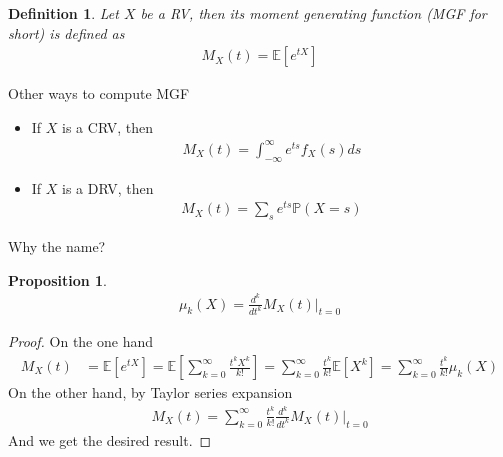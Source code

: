 \documentclass[10pt]{article}
\newtheorem*{proposition}{Proposition}
\newtheorem*{definition}{Definition}
\begin{document}
\begin{definition}
    Let $X$ be a RV, then its moment generating function (MGF for short) is
    defined as
    \begin{align}
        M_X(t)=\mathbb{E}[e^{tX}]
    \end{align}
\end{definition}

Other ways to compute MGF

\begin{itemize}
    \item If $X$ is a CRV, then
          \begin{align}
              M_X(t)=\int_{-\infty}^\infty e^{ts}f_X(s)ds
          \end{align}
    \item If $X$ is a DRV, then
          \begin{align}
              M_X(t)=\sum_s e^{ts}\mathbb{P}(X=s)
          \end{align}
\end{itemize}

Why the name?

\begin{proposition}
    \begin{align}
        \mu_k(X)=\frac{d^k}{dt^k}M_X(t)\Biggl|_{t=0}
    \end{align}
\end{proposition}

\begin{proof}
    On the one hand
    \begin{align}
        M_X(t)
         & =\mathbb{E}[e^{tX}]
        =\mathbb{E}[\sum_{k=0}^\infty\frac{t^k X^k}{k!}]
        =\sum_{k=0}^\infty\frac{t^k}{k!}\mathbb{E}[X^k]
        =\sum_{k=0}^\infty\frac{t^k}{k!}\mu_k(X)
    \end{align}
    On the other hand, by Taylor series expansion
    \begin{align}
        M_X(t)=
        \sum_{k=0}^\infty\frac{t^k}{k!} \frac{d^k}{dt^k}M_X(t)\Biggl|_{t=0}
    \end{align}
    And we get the desired result.
\end{proof}
\end{document}
